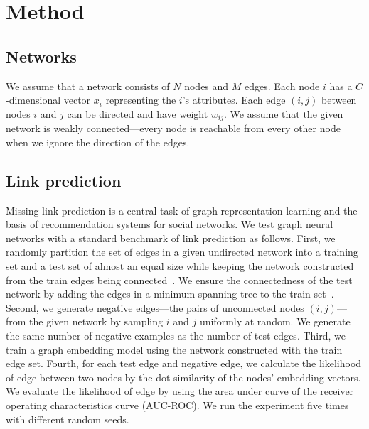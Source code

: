 \documentclass{article}
\theoremstyle{plain}
\theoremstyle{definition}
\theoremstyle{remark}
\def\sk#1{{\color{blue}{\textbf{SK: #1}}}}
\begin{document}


\section{Method}



\subsection{Networks}

We assume that a network consists of $N$ nodes and $M$ edges. 
Each node $i$ has a $C$-dimensional vector $x_i$ representing the $i$'s attributes. Each edge $(i,j)$ between nodes $i$ and $j$ can be directed and have weight $w_{ij}$. We assume that the given network is weakly connected---every node is reachable from every other node when we ignore the direction of the edges.

\subsection{Link prediction}

Missing link prediction is a central task of graph representation learning and the basis of recommendation systems for social networks.  
We test graph neural networks with a standard benchmark of link prediction as follows. 
First, we randomly partition the set of edges in a given undirected network into a training set and a test set of almost an equal size while keeping the network constructed from the train edges being connected~\cite{groverNode2vecScalableFeature2016,persona2vec}.
We ensure the connectedness of the test network by adding the edges in a minimum spanning tree to the train set~\cite{groverNode2vecScalableFeature2016,persona2vec}.
Second, we generate negative edges---the pairs of unconnected nodes $(i,j)$---from the given network by sampling $i$ and $j$ uniformly at random.
We generate the same number of negative examples as the number of test edges. 
Third, we train a graph embedding model using the network constructed with the train edge set.
Fourth, for each test edge and negative edge, we calculate the likelihood of edge between two nodes by the dot similarity of the nodes' embedding vectors.
We evaluate the likelihood of edge by using the area under curve of the receiver operating characteristics curve (AUC-ROC). 
We run the experiment five times with different random seeds.
\end{document}
